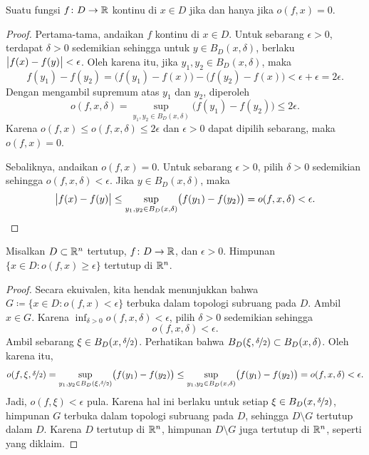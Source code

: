 \begin{prop}
\pagebreak[2]
Suatu fungsi
$f \colon D \to {\mathbb{R}}$ kontinu di $x \in D$ jika dan hanya jika $o(f,x) = 0$.
\end{prop}

\begin{proof}
Pertama-tama, andaikan $f$ kontinu di $x \in D$. Untuk sebarang $\epsilon > 0$,
terdapat $\delta > 0$ sedemikian sehingga untuk $y \in B_D(x,\delta)$,
berlaku $\bigl\lvert {f(x)-f(y)} \bigr\rvert < \epsilon$. Oleh karena itu, jika $y_1,y_2 \in
B_D(x,\delta)$, maka
\begin{equation*}
f(y_1)-f(y_2) =
\bigl(f(y_1)-f(x)\bigr)-\bigl(f(y_2)-f(x)\bigr) < \epsilon + \epsilon = 2 \epsilon .
\end{equation*}
Dengan mengambil supremum atas $y_1$ dan $y_2$, diperoleh
\begin{equation*}
o(f,x,\delta) = 
\sup_{y_1,y_2 \in B_D(x,\delta)} \bigl(f(y_1)-f(y_2)\bigr)
\leq
2 \epsilon .
\end{equation*}
Karena $o(f,x) \leq o(f,x,\delta) \leq 2\epsilon$ dan $\epsilon > 0$ dapat
dipilih sebarang, maka $o(f,x) = 0$.

Sebaliknya, andaikan $o(f,x) = 0$. Untuk sebarang $\epsilon > 0$,
pilih $\delta > 0$ sedemikian sehingga $o(f,x,\delta) < \epsilon$. Jika
$y \in B_D(x,\delta)$, maka
\begin{equation*}
\bigl\lvert {f(x)-f(y)} \bigr\rvert
\leq
\sup_{y_1,y_2 \in B_D(x,\delta)} \bigl(f(y_1)-f(y_2)\bigr)
=
o(f,x,\delta) < \epsilon. \qedhere
\end{equation*}
\end{proof}

\begin{prop} \label{prop:seclosed}
Misalkan $D \subset {\mathbb{R}}^n$ tertutup,
$f \colon D \to {\mathbb{R}}$, dan $\epsilon > 0$.
Himpunan $\bigl\{ x \in D : o(f,x) \geq \epsilon \bigr\}$ tertutup di ${\mathbb{R}}^n$.
\end{prop}

\begin{proof}
Secara ekuivalen, kita hendak menunjukkan bahwa
$G \coloneqq \bigl\{ x \in D : o(f,x) < \epsilon \bigr\}$ terbuka dalam topologi subruang pada $D$.
Ambil $x \in G$.
Karena $\inf_{\delta > 0} o(f,x,\delta) < \epsilon$, pilih $\delta > 0$
sedemikian sehingga
\begin{equation*}
o(f,x,\delta) < \epsilon .
\end{equation*}
Ambil sebarang $\xi \in B_D(x,\nicefrac{\delta}{2})$. Perhatikan bahwa
$B_D(\xi,\nicefrac{\delta}{2}) \subset B_D(x,\delta)$. Oleh karena itu,
\begin{equation*}
o(f,\xi,\nicefrac{\delta}{2}) =
\sup_{y_1,y_2 \in B_D(\xi,\nicefrac{\delta}{2})} \bigl(f(y_1)-f(y_2)\bigr) 
\leq
\sup_{y_1,y_2 \in B_D(x,\delta)} \bigl(f(y_1)-f(y_2)\bigr) = o(f,x,\delta) <
\epsilon .
\end{equation*}
Jadi, $o(f,\xi) < \epsilon$ pula. Karena hal ini berlaku untuk setiap $\xi \in
B_D(x,\nicefrac{\delta}{2})$, himpunan $G$ terbuka dalam topologi subruang
pada $D$, sehingga $D \setminus G$ tertutup dalam $D$.
Karena $D$ tertutup di ${\mathbb{R}}^n$, himpunan $D \setminus G$ juga tertutup di
${\mathbb{R}}^n$, seperti yang diklaim.
\end{proof}


